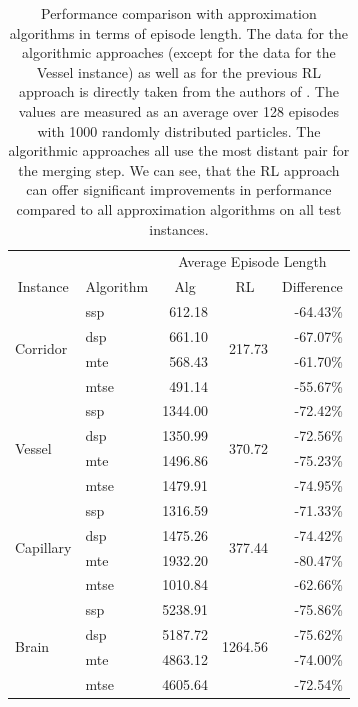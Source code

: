 \begin{table}[htp]
    \begin{center}
        \begin{tabular}{llrrr}
            \toprule
            & & \multicolumn{3}{c}{Average Episode Length} \\
            \cmidrule(lr){3-5} 
            \multicolumn{1}{c}{Instance} & \multicolumn{1}{c}{Algorithm} & \multicolumn{1}{c}{Alg} & \multicolumn{1}{c}{RL} & \multicolumn{1}{c}{Difference} \\
            \midrule
            \multirow{4}{*}{Corridor} & ssp & 612.18 & \multirow{4}{*}{217.73} & -64.43\% \\
            & dsp & 661.10 & & -67.07\% \\
            & mte & 568.43 & & -61.70\% \\
            & mtse & 491.14 & & -55.67\% \\
            \midrule
            \multirow{4}{*}{Vessel} & ssp & 1344.00 & \multirow{4}{*}{370.72} & -72.42\% \\
            & dsp & 1350.99 & & -72.56\% \\
            & mte & 1496.86 & & -75.23\% \\
            & mtse & 1479.91 & & -74.95\% \\
            \midrule
            \multirow{4}{*}{Capillary} & ssp & 1316.59 & \multirow{4}{*}{377.44} & -71.33\% \\
            & dsp & 1475.26 & & -74.42\% \\
            & mte & 1932.20 & & -80.47\% \\
            & mtse & 1010.84 & & -62.66\% \\
            \midrule
            \multirow{4}{*}{Brain} & ssp & 5238.91 & \multirow{4}{*}{1264.56} & -75.86\% \\
            & dsp & 5187.72 & & -75.62\% \\
            & mte & 4863.12 & & -74.00\% \\
            & mtse & 4605.64 & & -72.54\% \\
            \bottomrule
        \end{tabular}

    \end{center}
    \caption[Performance Comparison with Approximation Algorithms]{Performance comparison with approximation algorithms in terms of episode length. The data for the algorithmic approaches (except for the data for the Vessel instance) as well as for the previous RL approach is directly taken from the authors of \cite{becker2020}. The values are measured as an average over 128 episodes with 1000 randomly distributed particles. The algorithmic approaches all use the most distant pair for the merging step. We can see, that the RL approach can offer significant improvements in performance compared to all approximation algorithms on all test instances.} \label{tab:Eval/PreviousAlgorithmicApproach}
\end{table}


